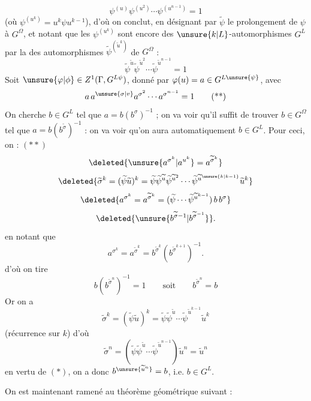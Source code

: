 \[
\psi^{(u)}\psi^{(u^2)}\cdots\psi^{(u^{n-1})}=1
\]
(où $\psi^{(u^k)}=u^k\psi u^{k-1}$), d'où on conclut, en désignant par $\widetilde\psi$ le prolongement de $\psi$ à $G^\Omega$, et notant que les $\psi^{(u^k)}$ sont encore des $\unsure{k|L}$-automorphismes  $G^L$ par la  des automorphismes $\widetilde\psi^{(\widetilde u^k)}$ de $G^\Omega$ :
\[
\widetilde\psi^{\widetilde u}\widetilde\psi^{\widetilde u^2}\cdots\widetilde\psi^{\widetilde u^{n-1}}=1 \tag*{(*)}
\]
Soit $\unsure{\varphi|\phi}\in Z^1(\Gamma,G^{L\psi})$, donné par $\varphi(u)=a\in G^{L\unsure{\psi}}$, avec
\[
a\,a^{\unsure{\sigma|v}}a^{\sigma^2}\cdots a^{\sigma^{n-1}}=1 \tag*{(**)}
\]
On cherche $b\in G^L$ tel que $a=b(b^\sigma)^{-1}$ ; on va voir qu'il suffit de  trouver $b\in G^\Omega$ tel que $a=b(b^{\widetilde\sigma})^{-1}$ : on va voir qu'on aura automatiquement $b\in G^L$.
Pour ceci, on   :  $(**)$
\[
\deleted{\unsure{a^{\sigma^k}|a^{u^k}}=a^{\widetilde\sigma^k}}
\]
\[
\deleted{\widetilde\sigma^k=(\widetilde\psi\widetilde u)^k=\widetilde\psi\widetilde\psi^{\widetilde u}\widetilde\psi^{\widetilde u^2}\cdots\widetilde\psi^{\widetilde u^{\unsure{k|k-1}}}\widetilde u^k}
\]
\[
\deleted{a^{\sigma^k}=a^{\widetilde\sigma^k}=(\widetilde\psi\cdots\widetilde\psi^{\widetilde u^{k-1}})\,b\,b^\sigma}
\]
\[
\deleted{\unsure{b^{\widetilde\sigma-1}|b^{\widetilde\sigma^{-1}}}}.
\]
en notant que
\[
a^{\sigma^k}=a^{\widetilde\sigma^k}=b^{\widetilde\sigma^k}(b^{\widetilde\sigma^{k+1}})^{-1}.
\]
d'où on tire
\[
b(b^{\widetilde\sigma^n})^{-1}=1\qquad\text{soit}\qquad b^{\widetilde\sigma^n}=b
\]
Or on a
\[
\widetilde\sigma^k=(\widetilde\psi\widetilde u)^k=\widetilde\psi\widetilde\psi^{\widetilde u}\cdots\widetilde\psi^{\widetilde u^{k-1}}\widetilde u^k
\]
(récurrence sur $k$) d'où
\[
\widetilde\sigma^n=(\widetilde\psi\widetilde\psi^{\widetilde u}\cdots\widetilde\psi^{\widetilde u^{n-1}})\widetilde u^n=\widetilde u^n
\]
en vertu de $(*)$, on a donc $b^{\unsure{\widetilde u^n}}=b$, i.e. $b\in G^L$.

On est maintenant ramené au théorème géométrique suivant :
